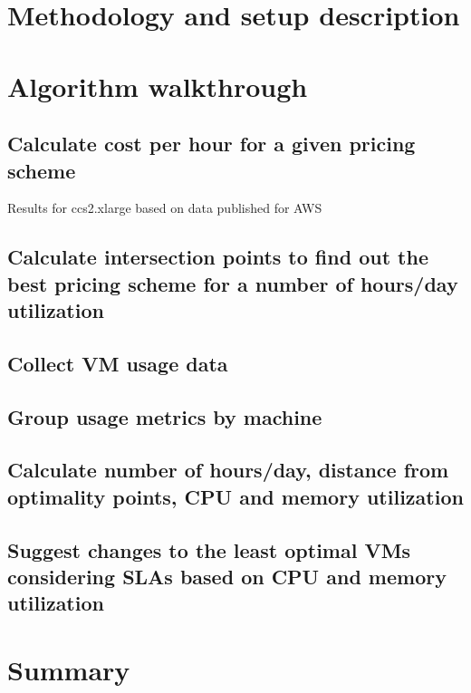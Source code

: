 \documentclass[]{final_report}
\begin{document}
\section{Methodology and setup description}

\section{Algorithm walkthrough}
\subsection{Calculate cost per hour for a given pricing scheme}
Results for ccs2.xlarge based on data published for AWS~\cite{AWS:2014} \par
{}
\subsection{Calculate intersection points to find out the best pricing scheme for a number of hours/day utilization}
\subsection{Collect VM usage data}
\subsection{Group usage metrics by machine}
\subsection{Calculate number of hours/day, distance from optimality points, CPU and memory utilization}
\subsection{Suggest changes to the least optimal VMs considering SLAs based on CPU and memory utilization}

\section{Summary}


\end{document}
